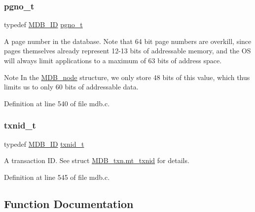 \subsubsection{\texorpdfstring{pgno\+\_\+t}{pgno\_t}}
{\footnotesize\ttfamily typedef \mbox{\hyperlink{group__idls_ga792192229a977c49f083846b5635f92d}{M\+D\+B\+\_\+\+ID}} \mbox{\hyperlink{group__internal_gadb65f0424c9d3827bf6409087ad555cd}{pgno\+\_\+t}}}

A page number in the database. Note that 64 bit page numbers are overkill, since pages themselves already represent 12-\/13 bits of addressable memory, and the OS will always limit applications to a maximum of 63 bits of address space.

\begin{DoxyNote}{Note}
In the \mbox{\hyperlink{struct_m_d_b__node}{M\+D\+B\+\_\+node}} structure, we only store 48 bits of this value, which thus limits us to only 60 bits of addressable data. 
\end{DoxyNote}


Definition at line 540 of file mdb.\+c.

\mbox{\label{group__internal_gabbaef7c9c710f8652a62c32d748c040e}} 
\subsubsection{\texorpdfstring{txnid\+\_\+t}{txnid\_t}}
{\footnotesize\ttfamily typedef \mbox{\hyperlink{group__idls_ga792192229a977c49f083846b5635f92d}{M\+D\+B\+\_\+\+ID}} \mbox{\hyperlink{group__internal_gabbaef7c9c710f8652a62c32d748c040e}{txnid\+\_\+t}}}

A transaction ID. See struct \mbox{\hyperlink{struct_m_d_b__txn_a26512036328af11cdaeb6c9880859290}{M\+D\+B\+\_\+txn.\+mt\+\_\+txnid}} for details. 

Definition at line 545 of file mdb.\+c.



\subsection{Function Documentation}
\mbox{\label{group__internal_gaba790a2493f744965b810efac73bac0e}} 
